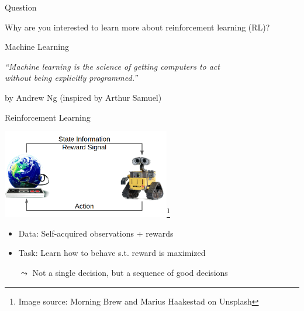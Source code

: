 \documentclass[aspectratio=169]{../latex_main/tntbeamer}  %
\begin{document}
\begin{frame}[c]{Question}
	
	\centering
	{
	\huge
	Why are you interested to learn more about reinforcement learning (RL)?
	}

	
\end{frame}
\begin{frame}[c]{Machine Learning}

\centering
\textit{``Machine learning is the science of getting computers to act\\
 without being explicitly programmed.''}

\hfill by Andrew Ng (inspired by Arthur Samuel)

\end{frame}
\begin{frame}[c]{Reinforcement Learning}
	
	\centering
	\includegraphics[width=0.55\textwidth]{images/rl_comic.png}\footnote{Image source: Morning Brew and Marius Haakestad on Unsplash}
	
	\bigskip
	
	\begin{itemize}
		\item Data: Self-acquired observations + rewards
		\item Task: Learn how to behave s.t. reward is maximized
		\item[$\leadsto$] Not a single decision, but a sequence of good decisions
	\end{itemize}	
	
	
\end{frame}
\end{document}
